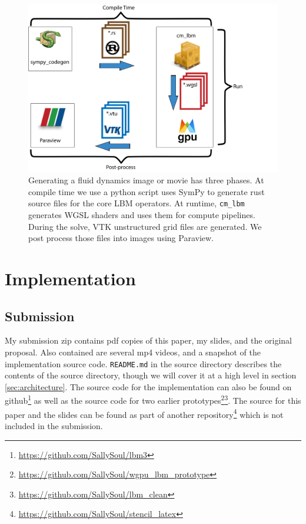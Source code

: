 \begin{figure}
\begin{center}
\includegraphics[width=\linewidth]{workflow.png}
\end{center}
  \caption{Generating a fluid dynamics image or movie
    has three phases. At compile time we use a
    python script uses SymPy to generate
  rust source files for the core LBM operators.
  At runtime, \lstinline{cm_lbm} generates WGSL shaders
  and uses them for compute pipelines.
  During the solve, VTK unstructured grid files are
  generated. 
  We post process those files into images using Paraview.
}
  \label{fig:architecture}
\end{figure}

\section{Implementation}\label{sec:implementation}
\subsection{Submission}
My submission zip contains pdf copies of this paper, my slides, and the original proposal. 
Also contained are
several mp4 videos, and a snapshot of the implementation source code.
\lstinline{README.md} in the source directory describes the contents
of the source directory,
though we will cover it at a high level in section \ref{sec:architecture}. 
The source code for the implementation can also be found on 
github\footnote{\url{https://github.com/SallySoul/lbm3}}
as well as the source code for two earlier 
prototypes\footnote{\url{https://github.com/SallySoul/wgpu_lbm_prototype}}\footnote{\url{https://github.com/SallySoul/lbm_clean}}.
The source for this paper and the slides can be found as 
part of another repository\footnote{\url{https://github.com/SallySoul/stencil_latex}} 
which is not included in the submission.

